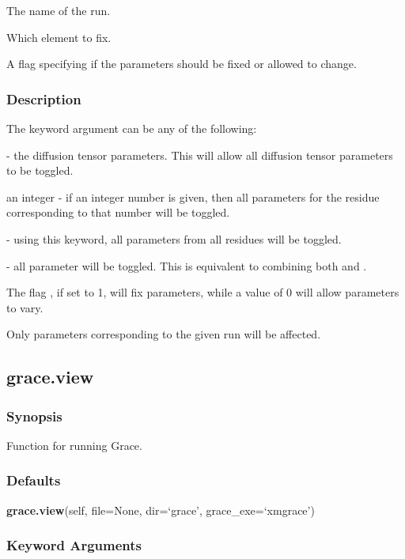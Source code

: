   The name of the run.

  Which element to fix.

  A flag specifying if the parameters should be fixed or allowed to change.

\subsubsection{Description}

The keyword argument 
 can be any of the following:

 - the diffusion tensor parameters.  This will allow all diffusion tensor parameters
to be toggled.

an integer - if an integer number is given, then all parameters for the residue
corresponding to that number will be toggled.

 - using this keyword, all parameters from all residues will be toggled.

 - all parameter will be toggled.  This is equivalent to combining both 
 and
.


The flag 
, if set to 1, will fix parameters, while a value of 0 will allow parameters
to vary.


Only parameters corresponding to the given run will be affected.


\newpage

\subsection{grace.view}


\subsubsection{Synopsis}

Function for running Grace.

\subsubsection{Defaults}

\textsf{\textbf{grace.view}(self, file=None, dir=`grace', grace\_exe=`xmgrace')}


\subsubsection{Keyword Arguments}


